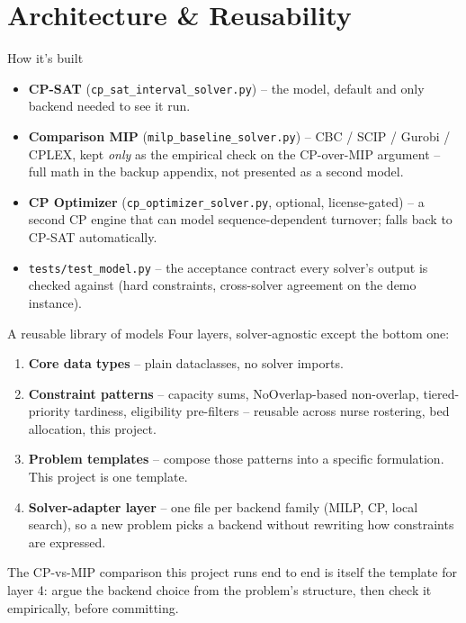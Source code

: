 \documentclass[aspectratio=169]{beamer}
\begin{document}
\section{Architecture \& Reusability}

\begin{frame}{How it's built}
  \begin{itemize}
    \item \textbf{CP-SAT} (\texttt{cp\_sat\_interval\_solver.py}) -- the
      model, default and only backend needed to see it run.
    \item \textbf{Comparison MIP} (\texttt{milp\_baseline\_solver.py}) --
      CBC / SCIP / Gurobi / CPLEX, kept \emph{only} as the empirical check
      on the CP-over-MIP argument -- full math in the backup appendix, not
      presented as a second model.
    \item \textbf{CP Optimizer} (\texttt{cp\_optimizer\_solver.py},
      optional, license-gated) -- a second CP engine that can model
      sequence-dependent turnover; falls back to CP-SAT automatically.
    \item \texttt{tests/test\_model.py} -- the acceptance contract every
      solver's output is checked against (hard constraints, cross-solver
      agreement on the demo instance).
  \end{itemize}
\end{frame}

\begin{frame}{A reusable library of models}
  Four layers, solver-agnostic except the bottom one:
  \begin{enumerate}
    \item \textbf{Core data types} -- plain dataclasses, no solver imports.
    \item \textbf{Constraint patterns} -- capacity sums, NoOverlap-based
      non-overlap, tiered-priority tardiness, eligibility pre-filters --
      reusable across nurse rostering, bed allocation, this project.
    \item \textbf{Problem templates} -- compose those patterns into a
      specific formulation. This project is one template.
    \item \textbf{Solver-adapter layer} -- one file per backend family
      (MILP, CP, local search), so a new problem picks a backend without
      rewriting how constraints are expressed.
  \end{enumerate}
  \footnotesize The CP-vs-MIP comparison this project runs end to end is
  itself the template for layer 4: argue the backend choice from the
  problem's structure, then check it empirically, before committing.
\end{frame}
\end{document}

